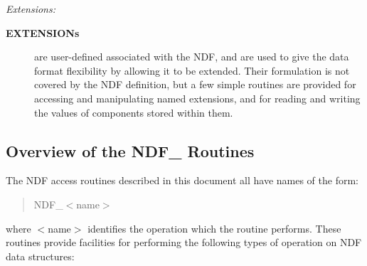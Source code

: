 \documentclass[twoside,11pt,nolof]{starlink}
\providecommand{\st}[1]{{\emph{#1}}}
\begin{document}
\newpage
{\large \st{Extensions:}}

\begin{description}

\item[\textbf{EXTENSIONs}] are user-defined  associated with the NDF, and are used
to give the data format flexibility by allowing it to be extended.
Their formulation is not covered by the NDF definition, but a few simple
routines are provided for accessing and manipulating named extensions, and
for reading and writing the values of components stored within them.

\end{description}

\subsection{Overview of the NDF\_ Routines}

The NDF access routines described in this document all have names of the
form:

\small
\begin{quote}
NDF\_$<$name$>$
\end{quote}
\normalsize

where $<$name$>$ identifies the operation which the routine performs.
These routines provide facilities for performing the following types of
operation on NDF data structures:
\end{document}
